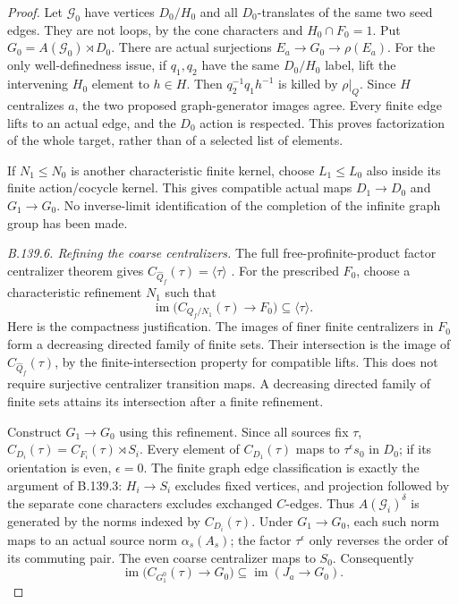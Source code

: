 \begin{proof}
Let $\mathcal G_0$ have vertices $D_0/H_0$ and all $D_0$-translates
of the same two seed edges. They are not loops, by the cone characters
and $H_0\cap F_0=1$. Put
$G_0=A(\mathcal G_0)\rtimes D_0$.
There are actual surjections $E_a\to G_0\to\rho(E_a)$.
For the only well-definedness issue, if $q_1,q_2$ have the same
$D_0/H_0$ label, lift the intervening $H_0$ element to $h\in H$.
Then $q_2^{-1}q_1h^{-1}$ is killed by $\rho|_Q$.
Since $H$ centralizes $a$, the two proposed graph-generator
images agree. Every finite edge lifts to an actual edge, and the
$D_0$ action is respected. This proves factorization of the whole
target, rather than of a selected list of elements.

If $N_1\leq N_0$ is another characteristic finite kernel, choose
$L_1\leq L_0$ also inside its finite action/cocycle kernel.
This gives compatible actual maps $D_1\to D_0$ and
$G_1\to G_0$. No inverse-limit identification of the completion
of the infinite graph group has been made.

\emph{B.139.6. Refining the coarse centralizers.}
The full free-profinite-product factor centralizer theorem gives
$C_{\widehat Q_f}(\tau)=\langle\tau\rangle$
\citep{A_HR1985}.
For the prescribed $F_0$, choose a characteristic refinement $N_1$
such that
\begin{equation}\label{eq:B139-centralizer-refinement}
 \operatorname{im}\bigl(C_{Q_f/N_1}(\tau)\to F_0\bigr)
       \subseteq\langle\tau\rangle.
\end{equation}
Here is the compactness justification. The images of finer finite
centralizers in $F_0$ form a decreasing directed family of finite
sets. Their intersection is the image of
$C_{\widehat Q_f}(\tau)$, by the finite-intersection property for
compatible lifts. This does not require surjective centralizer
transition maps. A decreasing directed family of finite sets
attains its intersection after a finite refinement.

Construct $G_1\to G_0$ using this refinement.
Since all sources fix $\tau$,
$C_{D_i}(\tau)=C_{F_i}(\tau)\rtimes S_i$.
Every element of $C_{D_1}(\tau)$ maps to $\tau^\epsilon s_0$
in $D_0$; if its orientation is even, $\epsilon=0$.
The finite graph edge classification is exactly the argument of
B.139.3: $H_i\to S_i$ excludes fixed vertices, and projection
followed by the separate cone characters excludes exchanged
$C$-edges. Thus $A(\mathcal G_i)^\delta$ is generated by the
norms indexed by $C_{D_i}(\tau)$.
Under $G_1\to G_0$, each such norm maps to an actual source norm
$\alpha_s(A_s)$; the factor $\tau^\epsilon$ only reverses the
order of its commuting pair. The even coarse centralizer maps
to $S_0$. Consequently
\begin{equation}\label{eq:B139-discrete-head-control}
 \operatorname{im}\bigl(C_{G_1^0}(\tau)\to G_0\bigr)
       \subseteq\operatorname{im}(J_a\to G_0).
\end{equation}


\end{proof}
